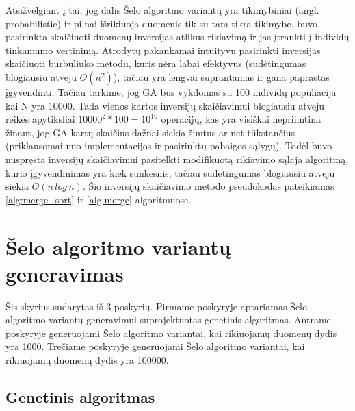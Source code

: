 \documentclass{VUMIFInfKursinis}
\begin{document}
Atsižvelgiant į tai, jog dalis Šelo algoritmo variantų yra tikimybiniai (angl. probabilistic) ir pilnai išrikiuoja duomenis tik su tam tikra tikimybe,
buvo pasirinkta skaičiuoti duomenų inversijas atlikus rikiavimą ir jas įtraukti į individų tinkamumo vertinimą.
Atrodytų pakankamai intuityvu pasirinkti inversijas skaičiuoti burbuliuko metodu, kuris nėra labai efektyvus (sudėtingumas blogiausiu atveju $O(n^2)$),
tačiau yra lengvai suprantamas ir gana paprastas įgyvendinti.
Tačiau tarkime, jog GA bus vykdomas su 100 individų populiacija kai N yra 10000.
Tada vienos kartos inversijų skaičiavimui blogiausiu atveju reikės apytiksliai $10000^2 * 100 = 10^{10}$ operacijų, kas yra visiškai nepriimtina žinant,
jog GA kartų skaičius dažnai siekia šimtus ar net tūkstančius (priklausomai nuo implementacijos ir pasirinktų pabaigos sąlygų).
Todėl buvo nuspręsta inversijų skaičiavimui pasitelkti modifikuotą rikiavimo sąlaja algoritmą, kurio įgyvendinimas yra kiek sunkesnis, tačiau sudėtingumas blogiausiu atveju siekia $O(n\,log\,n)$.
Šio inversijų skaičiavimo metodo pseudokodas pateikiamas \ref{alg:merge_sort} ir \ref{alg:merge} algoritmuose.

\section{Šelo algoritmo variantų generavimas}

Šis skyrius sudarytas iš 3 poskyrių.
Pirmame poskyryje aptariamas Šelo algoritmo variantų generavimui suprojektuotas genetinis algoritmas.
Antrame poskyryje generuojami Šelo algoritmo variantai, kai rikiuojamų duomenų dydis yra 1000.
Trečiame poskyryje generuojami Šelo algoritmo variantai, kai rikiuojamų duomenų dydis yra 100000.

\subsection{Genetinis algoritmas}
\end{document}
